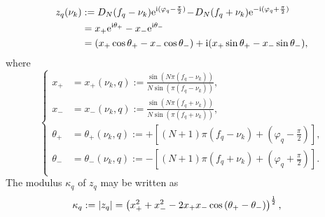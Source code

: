 \documentclass[journal]{IEEEtran}
\begin{document}
 \begin{equation} 
  \begin{aligned}
	z_q(\nu_k) &:= D_N(f_q -\nu_k)  \mathrm{e}^{{\rm{i}} (\varphi_q-\frac{\pi}{2})} \!-\! D_N(f_q +\nu_k) \mathrm{e}^{-{\rm{i}}(\varphi_q+\frac{\pi}{2})} \\
	        &=  x_{+}  \mathrm{e}^{{\rm{i}} \theta_+ } -  x_{-}  \mathrm{e}^{ {\rm{i}} \theta_{-} }\\
		&=  ( x_{+}  \cos\theta_+ -   x_{-}  \cos\theta_{-} )+ {\rm{i}}  ( x_{+} \sin\theta_+ -   x_{-}\sin\theta_{-} ),
 \end{aligned}
 \label{zp}
\end{equation}
where
$$
\left\{
  \begin{aligned}
 	x_{+}&=  x_{+}\left({\nu_k},q\right)  :=  \frac{\sin(N\pi (f_q - \nu_k))}{N\sin(\pi (f_q - \nu_k))},  \\
 	x_{-}&=  x_{-}\left({\nu_k},q\right)    :=  \frac{\sin(N\pi (f_q + \nu_k))}{N\sin(\pi (f_q + \nu_k))} , \\
	\theta_+ &= \theta_+\left({\nu_k},q\right) :=  + [ (N+1)\pi (f_q - \nu_k)+ (\varphi_q-\frac{\pi}{2})], \\
	\theta_- &= \theta_-\left({\nu_k},q\right)  :=  -[ (N+1)\pi (f_q + \nu_k)+ (\varphi_q+\frac{\pi}{2})]. \\	
 \end{aligned}
 \right.
$$
The modulus $\kappa_q$ of $z_q$ may be written as  
  \begin{equation} 
 	\begin{aligned}
		 & \kappa_q  :=  | z_q | = \left( x_{+}^2 +  x_{-}^2 - 2 x_{+}  x_{-}  \cos{(\theta_+-\theta_{-}) }\right)^{\frac{1}{2}},
 	\end{aligned}
	\vspace{-0.4cm}
 	 \label{eq_keppa}	
 \end{equation} 
\end{document}
